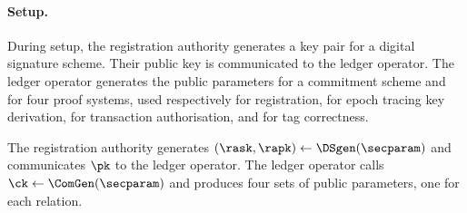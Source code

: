 \paragraph{Setup.} During setup, the registration authority generates a key
pair for a digital signature scheme. Their public key is communicated to the
ledger operator. The ledger operator generates the public parameters for a
commitment scheme and for four proof systems, used respectively for
registration, for epoch tracing key derivation, for transaction authorisation,
and for tag correctness.

The registration authority generates $(\rask, \rapk) \leftarrow
\DSgen(\secparam)$ and communicates $\pk$ to the ledger operator.  The ledger
operator calls $\ck \leftarrow \ComGen(\secparam)$ and produces four sets of
public parameters, one for each relation.

